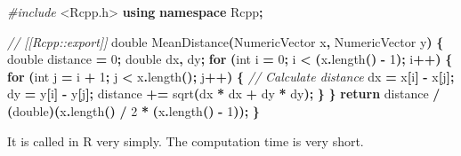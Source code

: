 \documentclass[
  12pt,
  american,
  a4paper,
  extrafontsizes,onecolumn,openright
  ]{memoir}
\newenvironment{Shaded}{\begin{snugshade}}{\end{snugshade}}
\newcommand{\CommentTok}[1]{\textcolor[rgb]{0.56,0.35,0.01}{\textit{#1}}}
\newcommand{\ControlFlowTok}[1]{\textcolor[rgb]{0.13,0.29,0.53}{\textbf{#1}}}
\newcommand{\DataTypeTok}[1]{\textcolor[rgb]{0.13,0.29,0.53}{#1}}
\newcommand{\DecValTok}[1]{\textcolor[rgb]{0.00,0.00,0.81}{#1}}
\newcommand{\ImportTok}[1]{#1}
\newcommand{\KeywordTok}[1]{\textcolor[rgb]{0.13,0.29,0.53}{\textbf{#1}}}
\newcommand{\NormalTok}[1]{#1}
\newcommand{\OperatorTok}[1]{\textcolor[rgb]{0.81,0.36,0.00}{\textbf{#1}}}
\newcommand{\PreprocessorTok}[1]{\textcolor[rgb]{0.56,0.35,0.01}{\textit{#1}}}
\begin{document}
\begin{Shaded}
\begin{Highlighting}[]
\PreprocessorTok{\#include }\ImportTok{\textless{}Rcpp.h\textgreater{}}
\KeywordTok{using} \KeywordTok{namespace}\NormalTok{ Rcpp}\OperatorTok{;}

\CommentTok{// [[Rcpp::export]]}
\DataTypeTok{double}\NormalTok{ MeanDistance}\OperatorTok{(}\NormalTok{NumericVector x}\OperatorTok{,}\NormalTok{ NumericVector y}\OperatorTok{)} \OperatorTok{\{}
  \DataTypeTok{double}\NormalTok{ distance }\OperatorTok{=} \DecValTok{0}\OperatorTok{;}
  \DataTypeTok{double}\NormalTok{ dx}\OperatorTok{,}\NormalTok{ dy}\OperatorTok{;}
  \ControlFlowTok{for} \OperatorTok{(}\DataTypeTok{int}\NormalTok{ i }\OperatorTok{=} \DecValTok{0}\OperatorTok{;}\NormalTok{ i }\OperatorTok{\textless{}} \OperatorTok{(}\NormalTok{x}\OperatorTok{.}\NormalTok{length}\OperatorTok{()} \OperatorTok{{-}} \DecValTok{1}\OperatorTok{);}\NormalTok{ i}\OperatorTok{++)} \OperatorTok{\{}
    \ControlFlowTok{for} \OperatorTok{(}\DataTypeTok{int}\NormalTok{ j }\OperatorTok{=}\NormalTok{ i }\OperatorTok{+} \DecValTok{1}\OperatorTok{;}\NormalTok{ j }\OperatorTok{\textless{}}\NormalTok{ x}\OperatorTok{.}\NormalTok{length}\OperatorTok{();}\NormalTok{ j}\OperatorTok{++)} \OperatorTok{\{}
    \CommentTok{// Calculate distance}
\NormalTok{        dx }\OperatorTok{=}\NormalTok{ x}\OperatorTok{[}\NormalTok{i}\OperatorTok{]} \OperatorTok{{-}}\NormalTok{ x}\OperatorTok{[}\NormalTok{j}\OperatorTok{];}
\NormalTok{        dy }\OperatorTok{=}\NormalTok{ y}\OperatorTok{[}\NormalTok{i}\OperatorTok{]} \OperatorTok{{-}}\NormalTok{ y}\OperatorTok{[}\NormalTok{j}\OperatorTok{];}
\NormalTok{        distance }\OperatorTok{+=}\NormalTok{ sqrt}\OperatorTok{(}\NormalTok{dx }\OperatorTok{*}\NormalTok{ dx }\OperatorTok{+}\NormalTok{ dy }\OperatorTok{*}\NormalTok{ dy}\OperatorTok{);}
    \OperatorTok{\}}
  \OperatorTok{\}}
  \ControlFlowTok{return}\NormalTok{ distance }\OperatorTok{/} \OperatorTok{(}\DataTypeTok{double}\OperatorTok{)(}\NormalTok{x}\OperatorTok{.}\NormalTok{length}\OperatorTok{()} \OperatorTok{/} \DecValTok{2} \OperatorTok{*} \OperatorTok{(}\NormalTok{x}\OperatorTok{.}\NormalTok{length}\OperatorTok{()} \OperatorTok{{-}} \DecValTok{1}\OperatorTok{));}
\OperatorTok{\}}
\end{Highlighting}
\end{Shaded}

\normalsize

It is called in R very simply.
The computation time is very short.
\end{document}
